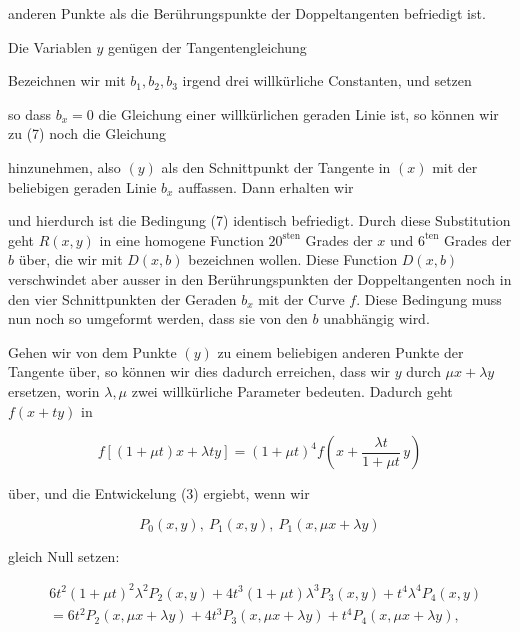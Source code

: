 anderen Punkte als die Berührungspunkte der Doppeltangenten
befriedigt ist.

Die Variablen $y$ genügen der Tangentengleichung


Bezeichnen wir mit $b_1, b_2, b_3$ irgend drei willkürliche Constanten, und setzen


so dass $b_x = 0$ die Gleichung einer willkürlichen geraden Linie ist, so können wir zu (7) noch die Gleichung


hinzunehmen, also $(y)$ als den Schnittpunkt der Tangente in $(x)$ mit der beliebigen geraden Linie $b_x$ auffassen. Dann erhalten wir


und hierdurch ist die Bedingung (7) identisch befriedigt. Durch diese Substitution geht $R(x,y)$ in eine homogene Function $20^{\text{sten}}$ Grades der $x$ und $6^{\text{ten}}$ Grades der $b$ über, die wir mit $D(x,b)$ bezeichnen wollen. Diese Function $D(x,b)$ verschwindet aber ausser in den Berührungspunkten der Doppeltangenten noch in den vier Schnittpunkten der Geraden $b_x$ mit der Curve $f$. Diese Bedingung muss nun noch so umgeformt werden, dass sie von den $b$ unabhängig wird.

Gehen wir von dem Punkte $(y)$ zu einem beliebigen anderen Punkte der Tangente über, so können wir dies dadurch erreichen, dass wir $y$ durch $\mu x + \lambda y$ ersetzen, worin $\lambda, \mu$ zwei willkürliche Parameter bedeuten. Dadurch geht $f(x+ty)$ in

\[
f[(1+\mu t)x + \lambda t y] = (1+\mu t)^4 f\left(x + \frac{\lambda t}{1+\mu t}\, y\right)
\]

über, und die Entwickelung (3) ergiebt, wenn wir

\[
P_0(x,y),\ P_1(x,y),\ P_1(x,\mu x + \lambda y)
\]

gleich Null setzen:

\[
\begin{aligned}
&6t^2(1+\mu t)^2\lambda^2 P_2(x,y) + 4t^3(1+\mu t)\lambda^3 P_3(x,y) + t^4\lambda^4 P_4(x,y)\\
&= 6t^2 P_2(x,\mu x + \lambda y) + 4t^3 P_3(x,\mu x + \lambda y) + t^4 P_4(x,\mu x + \lambda y),
\end{aligned}
\]
